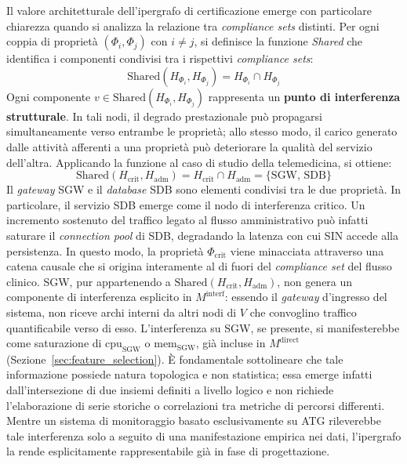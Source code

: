 Il valore architetturale dell'ipergrafo di certificazione emerge con particolare chiarezza quando
si analizza la relazione tra \textit{compliance sets} distinti. Per ogni coppia di proprietà
$(\Phi_i, \Phi_j)$ con $i \neq j$, si definisce la funzione \textit{Shared} che identifica i
componenti condivisi tra i rispettivi \textit{compliance sets}:
\begin{equation}
\label{eq:shared}
\text{Shared}(H_{\Phi_i}, H_{\Phi_j}) = H_{\Phi_i} \cap H_{\Phi_j}
\end{equation}
Ogni componente $v \in \text{Shared}(H_{\Phi_i}, H_{\Phi_j})$ rappresenta un \textbf{punto di
interferenza strutturale}. In tali nodi, il degrado prestazionale può propagarsi simultaneamente
verso entrambe le proprietà; allo stesso modo, il carico generato dalle attività afferenti a una
proprietà può deteriorare la qualità del servizio dell'altra.
Applicando la funzione al caso di studio della telemedicina, si ottiene:
\begin{equation}
\label{eq:shared_telemed}
\text{Shared}(H_{\text{crit}}, H_{\text{adm}}) = H_{\text{crit}} \cap H_{\text{adm}}
= \{\text{SGW},\, \text{SDB}\}
\end{equation}
Il \textit{gateway} SGW e il \textit{database} SDB sono elementi condivisi tra le due proprietà.
In particolare, il servizio SDB emerge come il nodo di interferenza critico. Un incremento
sostenuto del traffico legato al flusso amministrativo può infatti saturare il \textit{connection
pool} di SDB, degradando la latenza con cui SIN accede alla persistenza. In questo modo, la
proprietà $\Phi_{\text{crit}}$ viene minacciata attraverso una catena causale che si origina
interamente al di fuori del \textit{compliance set} del flusso clinico. SGW, pur appartenendo a
$\text{Shared}(H_{\text{crit}}, H_{\text{adm}})$, non genera un componente di interferenza
esplicito in $M^{\text{interf}}$: essendo il \textit{gateway} d'ingresso del sistema, non riceve
archi interni da altri nodi di $V$ che convoglino traffico quantificabile verso di esso.
L'interferenza su SGW, se presente, si manifesterebbe come saturazione di $\text{cpu}_{\text{SGW}}$
o $\text{mem}_{\text{SGW}}$, già incluse in $M^{\text{direct}}$
(Sezione~\ref{sec:feature_selection}).
È fondamentale sottolineare che tale informazione possiede natura topologica e non statistica; essa
emerge infatti dall'intersezione di due insiemi definiti a livello logico e non richiede
l'elaborazione di serie storiche o correlazioni tra metriche di percorsi differenti. Mentre un
sistema di monitoraggio basato esclusivamente su \gls{ATG} rileverebbe tale interferenza solo a
seguito di una manifestazione empirica nei dati, l'ipergrafo la rende esplicitamente rappresentabile
già in fase di progettazione.

